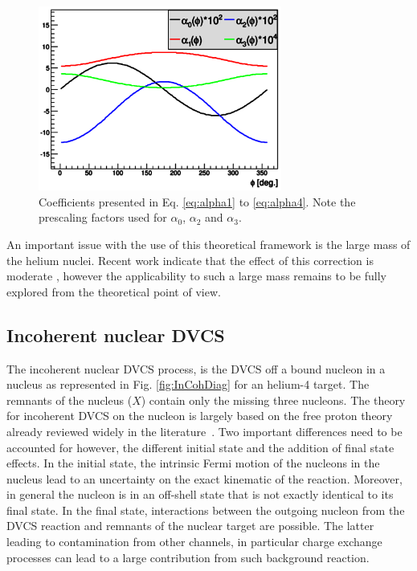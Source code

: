 \documentclass[aps,prc,preprint,superscriptaddress]{revtex4}
\begin{document}
\begin{figure}[tbp!]
\center
\includegraphics[width=8cm]{fig3/AlphaCoefs.png}
	\caption{Coefficients presented in Eq. \ref{eq:alpha1} to \ref{eq:alpha4}.
	Note the prescaling factors used for $\alpha_0$, $\alpha_2$ and $\alpha_3$.}
\label{fig:alphas}
\end{figure}

An important issue with the use of this theoretical framework is the large mass of the 
helium nuclei. Recent work indicate that the effect of this correction is moderate 
\cite{Braun:2012bg}, however the applicability to such a large mass remains to be
fully explored from the theoretical point of view.

\subsection{Incoherent nuclear DVCS}

The incoherent nuclear DVCS process, is the DVCS off a bound nucleon in a nucleus
as represented in Fig. \ref{fig:InCohDiag} for an helium-4 target. The remnants of 
the nucleus ($X$) contain only the missing three nucleons. 
The theory for incoherent DVCS on the nucleon is largely based on the free proton theory
already reviewed widely in the literature~\cite{Diehl:2003ny,Belitsky:2005qn,Guidal:2013rya}. 
Two important differences need to be accounted for however, the different initial state and the addition of 
final state effects. In the initial state, the intrinsic Fermi motion of the nucleons in the nucleus 
lead to an uncertainty on the exact kinematic of the reaction. Moreover, in general the nucleon 
is in an off-shell state that is not exactly identical to its final state. In the final state, 
interactions between the outgoing nucleon from the DVCS reaction and remnants of the nuclear 
target are possible. The latter leading to contamination from other channels, in particular 
charge exchange processes can lead to a large contribution from such background reaction. 
\end{document}
